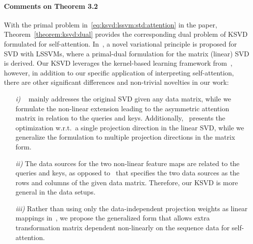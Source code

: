 \documentclass{article}
\begin{document}
\paragraph{Comments on Theorem 3.2} 
With the primal problem in~\eqref{eq:ksvd:lssvm:std:attention} in the paper, Theorem~\ref{theorem:ksvd:dual} provides the corresponding dual problem of KSVD formulated for self-attention. 
In~\cite{suykens2016svd}, a novel variational principle is proposed for SVD with LSSVMs, where a primal-dual formulation for the matrix (linear) SVD is derived. 
Our KSVD leverages the kernel-based learning framework from~\cite{suykens2016svd}, however, in addition to our specific application of interpreting self-attention, there are other significant differences and non-trivial novelties in our work: 
\begin{itemize}
\item[\emph{i)}]~\cite{suykens2016svd} mainly addresses the original SVD given any data matrix, while we formulate the non-linear extension leading to the asymmetric attention matrix in relation to the queries and keys. 
Additionally,~\cite{suykens2016svd} presents the optimization w.r.t.~a single projection direction in the linear SVD, while we generalize the formulation to multiple projection directions in the matrix form. 

\item[\emph{ii)}] The data sources for the two non-linear feature maps are related to the queries and keys, as opposed to~\cite{suykens2016svd} that specifies the two data sources as the rows and columns of the given data matrix. 
Therefore, our KSVD is more general in the data setups. 

\item[\emph{iii)}] Rather than using only the data-independent projection weights  as linear mappings in~\cite{suykens2016svd}, we propose the generalized form that allows extra transformation matrix dependent non-linearly on the sequence data for self-attention.
\end{itemize}
\end{document}
